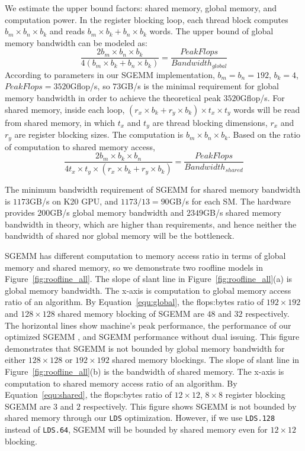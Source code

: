 We estimate the upper bound factors: 
shared memory, global memory, and computation power. In the register blocking loop, each thread block computes $b_m \times b_n \times b_k$ and reads $b_m \times b_k+b_n \times b_k$ words. The upper bound of global memory bandwidth can be modeled as:
{\small
\begin{equation}
    \frac{2 b_m \times b_n \times b_k}{4 (b_m \times b_k + b_n \times b_k)} = \frac{PeakFlops}{Bandwidth_{global}}
    \label{equ:global}
\end{equation}
}
According to parameters in our SGEMM implementation, $b_m=b_n=192$, $b_k=4$, $PeakFlops=3520$Gflop/s, so $73$GB/s is the minimal
requirement for global memory bandwidth in order to achieve the theoretical peak $3520$Gflop/s.
For shared memory, inside each loop, $(r_x \times b_k + r_y \times b_k) \times t_x \times t_y$ words will be read from shared memory, in which $t_x$ and
$t_y$ are thread blocking dimensions, $r_x$ and $r_y$ are register blocking sizes. The computation is $b_m \times b_n \times b_k$. Based on the ratio of computation to shared memory access,
{\small
\begin{equation}
    \frac{2 b_m \times b_k \times b_n}{4 t_x \times t_y \times (r_x \times b_k + r_y  \times b_k)}  = \frac{PeakFlops}{Bandwidth_{shared}}
    \label{equ:shared}
\end{equation}
}

The minimum bandwidth requirement of SGEMM for shared memory bandwidth is
$1173$GB/s on K20 GPU, and $1173/13=90$GB/s for each SM. The hardware provides
$200$GB/s global memory bandwidth and $2349$GB/s shared memory bandwidth in
theory, which are higher than requirements, and hence neither the bandwidth of
shared nor global memory will be the bottleneck.

SGEMM has different computation to memory access ratio in terms of global memory and shared memory, so we demonstrate
two roofline models in Figure~\ref{fig:roofline_all}. %
The slope of slant line in Figure~\ref{fig:roofline_all}(a) is global memory bandwidth. The x-axis is computation to global
memory access ratio of an algorithm. 
By Equation~\ref{equ:global}, the flops:bytes ratio of $192\times192$ and $128\times128$ shared 
memory blocking of SGEMM are $48$ and $32$ respectively. The horizontal lines
show machine's peak performance, the performance of our optimized SGEMM
, and SGEMM performance without dual issuing.
This figure demonstrates that SGEMM is not bounded by global memory bandwidth
for either $128\times128$ or $192\times 192$ shared memory blockings.
The slope of slant line in Figure~\ref{fig:roofline_all}(b) is the bandwidth of shared memory. The x-axis is computation to
shared memory access ratio of an algorithm. 
By Equation~\ref{equ:shared}, the flops:bytes ratio of $12\times12$, $8\times8$ register blocking SGEMM are $3$ and $2$ respectively. 
This figure shows SGEMM is not bounded by shared memory through our {\tt LDS} optimization. 
However, if we use {\tt LDS.128} instead of {\tt LDS.64}, SGEMM will be bounded by shared memory even for $12\times 12$ blocking.

